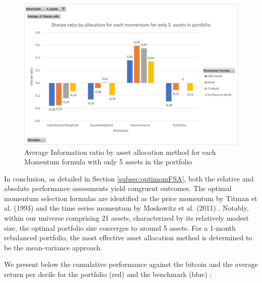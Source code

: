 \documentclass{article}
\begin{document}
\begin{figure}[H] %
    \centering
    \includegraphics[width=0.75\linewidth]{absolute_management/sharpe_by_aloc_for_all_mom_5_assets.png}
    \caption{Average Information ratio by asset allocation method for each Momentum formula with only 5 assets in the portfolio}
    \label{fig:IR_by_aloc_for_all_mom5assets}
\end{figure}

In conclusion, as detailed in Section \ref{subsec:optimomFSA}, both the relative and absolute performance assessments yield congruent outcomes. The optimal momentum selection formulas are identified as the price momentum by Titman et al. (1993) \cite{Titman1993} and the time series momentum by Moskowitz et al. (2011) \cite{Moskowitz2011}. Notably, within our universe comprising 21 assets, characterized by its relatively modest size, the optimal portfolio size converges to around 5 assets. For a 1-month rebalanced portfolio, the most effective asset allocation method is determined to be the mean-variance approach.

We present below the cumulative performance against the bitcoin and the average return per decile for the portfolio (red) and the benchmark (blue) :
\end{document}
